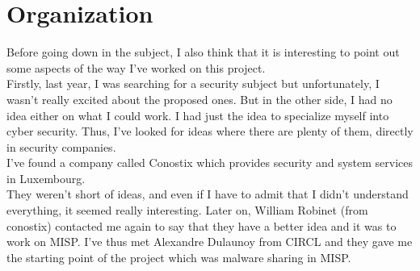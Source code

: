 \documentclass{eplmastersthesis}
\begin{document}
\section{Organization}
Before going down in the subject, I also think that it is interesting to point out some aspects of the way I've worked on this project.\\
Firstly, last year, I was searching for a security subject but unfortunately, I wasn't really excited about the proposed ones. But in the other side, I had no idea either on what I could work. I had just the idea to specialize myself into cyber security. Thus, I've looked for ideas where there are plenty of them, directly in security companies.\\
I've found a company called Conostix which provides security and system services in Luxembourg.\\
They weren't short of ideas, and even if I have to admit that I didn't understand everything, it seemed really interesting. Later on, William Robinet (from conostix) contacted me again to say that they have a better idea and it was to work on MISP. I've thus met Alexandre Dulaunoy from CIRCL and they gave me the starting point of the project which was malware sharing in MISP.\\
\end{document}
